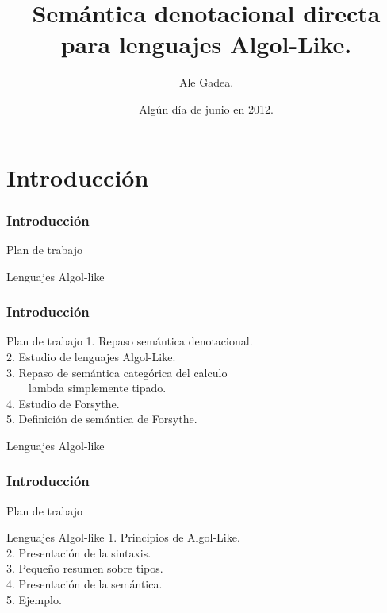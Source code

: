 \documentclass{beamer} %
\begin{document}
\title{Sem\'antica denotacional directa para lenguajes Algol-Like.}
\author{{Ale Gadea.}\\
\vspace*{0.5cm}}
\date{Alg\'un d\'ia de junio en 2012.}
\frame{\titlepage}

\section{Introducci\'on}

\begin{frame}
\frametitle{Introducci\'on}
\begin{block}{Plan de trabajo}
\end{block}
\begin{block}{Lenguajes Algol-like}
\end{block}
\end{frame}

\begin{frame}
\frametitle{Introducci\'on}
\begin{block}{Plan de trabajo}
1. Repaso sem\'antica denotacional.\\
2. Estudio de lenguajes Algol-Like.\\
3. Repaso de sem\'antica categ\'orica del calculo\\
\ \ \ \ lambda simplemente tipado.\\
4. Estudio de Forsythe.\\
5. Definici\'on de sem\'antica de Forsythe.
\end{block}
\begin{block}{Lenguajes Algol-like}
\end{block}
\end{frame}

\begin{frame}
\frametitle{Introducci\'on}
\begin{block}{Plan de trabajo}
\end{block}
\begin{block}{Lenguajes Algol-like}
1. Principios de Algol-Like.\\
2. Presentaci\'on de la sintaxis.\\
3. Peque\~no resumen sobre tipos.\\
4. Presentaci\'on de la sem\'antica.\\
5. Ejemplo.
\end{block}
\end{frame}
\end{document}
